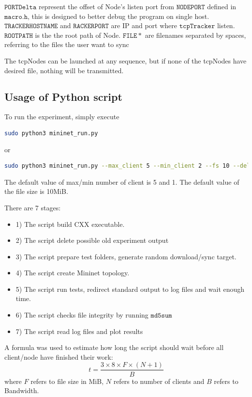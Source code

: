 $\mathtt{PORTDelta}$ represent the offset of Node's listen port from $\mathtt{NODEPORT}$ defined in $\mathtt{macro.h}$, this is designed to better debug the program on single host. $\mathtt{TRACKERHOSTNAME} $ and $\mathtt{RACKERPORT}$ are IP and port where $\mathtt{tcpTracker}$ listen. $\mathtt{ROOTPATH}$ is the the root path of Node. $\mathtt{FILE*}$ are filenames separated by spaces, referring to the files the user want to sync

The tcpNodes can be launched at any sequence, but if none of the tcpNodes have desired file, nothing will be transmitted.

\subsection{Usage of Python script}
To run the experiment, simply execute
\begin{lstlisting}[language=bash]
sudo python3 mininet_run.py
\end{lstlisting} 
or
\begin{lstlisting}[language=bash]
sudo python3 mininet_run.py --max_client 5 --min_client 2 --fs 10 --delay 3 --bw 10
\end{lstlisting} 
The default value of max/min number of client is 5 and 1. The default value of the file size is 10MiB. 

There are 7 stages: 
\begin{itemize}
\setlength{\itemsep}{0pt}
\item 1) The script build CXX executable. 
\item 2) The script delete possible old experiment output 
\item 3) The script prepare test folders, generate random download/sync target.
\item 4) The script create Mininet topology.
\item 5) The script run tests, redirect standard output to log files and wait enough time.
\item 6) The script checks file integrity by running $\mathtt{md5sum}$
\item 7) The script read log files and plot results
\end{itemize}

A formula was used to estimate how long the script should wait before all client/node have finished their work:
$$ t = \frac{3 \times 8 \times F \times (N+1)}{B}$$
where $F$ refers to file size in MiB, $N$ refers to number of clients and $B$ refers to Bandwidth.

